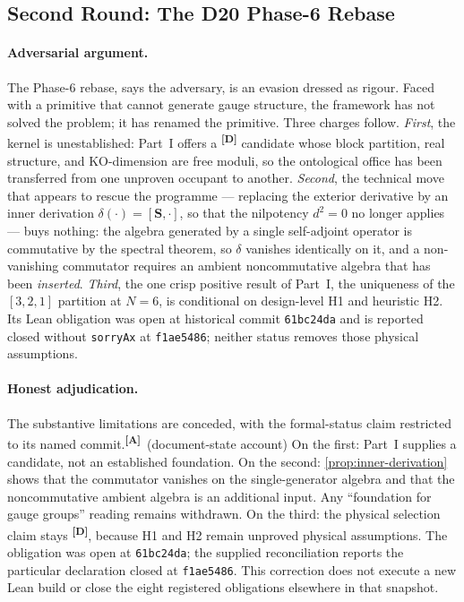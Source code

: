 \documentclass[12pt,a4paper,twoside]{article}
\theoremstyle{plain}
\theoremstyle{definition}
\theoremstyle{remark}
\newcommand{\catmark}[1]{\textsuperscript{\textsf{\textbf{[#1]}}}}
\begin{document}
\subsection{Second Round: The D20 Phase-6 Rebase}
\label{subsec:adversary-d19}

\paragraph{Adversarial argument.}
The Phase-6 rebase, says the adversary, is an evasion dressed as
rigour. Faced with a primitive that cannot generate gauge structure, the
framework has not solved the problem; it has renamed the primitive.
Three charges follow. \emph{First}, the kernel is unestablished: Part~I
offers a \catmark{D} candidate whose block partition, real structure, and
KO-dimension are free moduli, so the ontological office has been
transferred from one unproven occupant to another. \emph{Second}, the
technical move that appears to rescue the programme --- replacing the
exterior derivative by an inner derivation $\delta(\cdot) = [\mathbf
S,\cdot]$, so that the nilpotency $d^2=0$ no longer applies --- buys
nothing: the algebra generated by a single self-adjoint operator is
commutative by the spectral theorem, so $\delta$ vanishes identically on
it, and a non-vanishing commutator requires an ambient noncommutative
algebra that has been \emph{inserted}. \emph{Third}, the one crisp
positive result of Part~I, the uniqueness of the $[3,2,1]$ partition at
$N=6$, is conditional on design-level H1 and heuristic H2. Its Lean
obligation was open at historical commit \texttt{61bc24da} and is reported
closed without \texttt{sorryAx} at \texttt{f1ae5486}; neither status
removes those physical assumptions.

\paragraph{Honest adjudication.}
The substantive limitations are conceded, with the formal-status claim
restricted to its named commit.\catmark{A}\ (document-state account)
On the first: Part~I supplies a candidate, not an established foundation.
On the second: \cref{prop:inner-derivation} shows that the commutator
vanishes on the single-generator algebra and that the noncommutative
ambient algebra is an additional input. Any ``foundation for gauge groups''
reading remains withdrawn. On the third: the physical selection claim stays
\catmark{D}, because H1 and H2 remain unproved physical assumptions.
The obligation was open at \texttt{61bc24da}; the supplied reconciliation
reports the particular declaration closed at \texttt{f1ae5486}. This
correction does not execute a new Lean build or close the eight registered
obligations elsewhere in that snapshot.
\end{document}
